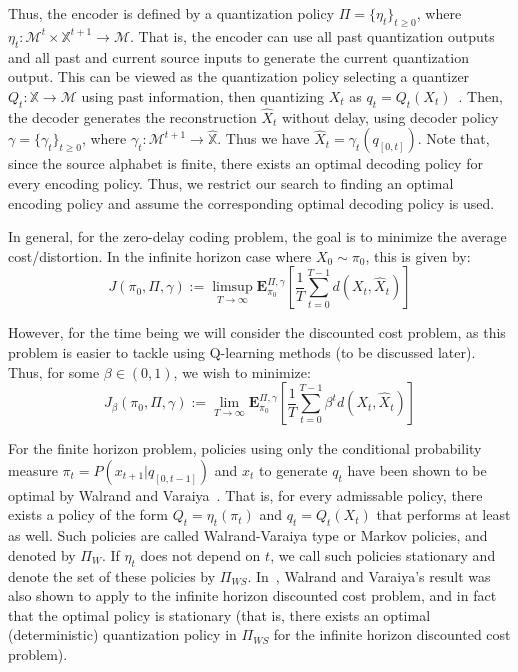 \documentclass{article}
\begin{document}
Thus, the encoder is defined by a quantization policy \( \Pi = \{\eta_t\}_{t \ge 0} \), where \( \eta_t : \mathcal{M}^t \times \mathbb{X}^{t+1} \to \mathcal{M} \). That is, the encoder can use all past quantization outputs and all past and current source inputs to generate the current quantization output. This can be viewed as the quantization policy selecting a quantizer \( Q_t : \mathbb{X} \to \mathcal{M} \) using past information, then quantizing \( X_t \) as \( q_t = Q_t(X_t) \)~\cite{Linder}. Then, the decoder generates the reconstruction \( \hat{X}_t \) without delay, using decoder policy \( \gamma = \{\gamma_t\}_{t \ge 0} \), where \( \gamma_t : \mathcal{M}^{t+1} \to \hat{\mathbb{X}} \). Thus we have \( \hat{X}_t = \gamma_t(q_{[0,t]}) \). Note that, since the source alphabet is finite, there exists an optimal decoding policy for every encoding policy. Thus, we restrict our search to finding an optimal encoding policy and assume the corresponding optimal decoding policy is used.

In general, for the zero-delay coding problem, the goal is to minimize the average cost/distortion. In the infinite horizon case where \( X_0 \sim \pi_0 \), this is given by: %
\[ J(\pi_0, \Pi, \gamma) := \limsup_{T\to\infty}\mathbf{E}_{\pi_0}^{\Pi, \gamma}\left[\frac{1}{T}\sum_{t=0}^{T-1}d(X_t,\hat{X}_t)\right] \]

However, for the time being we will consider the discounted cost problem, as this problem is easier to tackle using Q-learning methods (to be discussed later). Thus, for some \( \beta \in (0,1) \), we wish to minimize:
\[ J_{\beta}(\pi_0, \Pi, \gamma) := \lim_{T\to\infty}\mathbf{E}_{\pi_0}^{\Pi, \gamma}\left[\frac{1}{T}\sum_{t=0}^{T-1}\beta^t d(X_t,\hat{X}_t)\right] \]

For the finite horizon problem, policies using only the conditional probability measure \( \pi_t = P(x_{t+1}|q_{[0,t-1]}) \) and \( x_t \) to generate \( q_t \) have been shown to be optimal by Walrand and Varaiya~\cite{Walrand}. That is, for every admissable policy, there exists a policy of the form \( Q_t = \eta_t(\pi_t) \) and \( q_t = Q_t(X_t) \) that performs at least as well. Such policies are called Walrand-Varaiya type or Markov policies, and denoted by \( \Pi_{W} \). If \( \eta_t \) does not depend on \( t \), we call such policies stationary and denote the set of these policies by \( \Pi_{WS} \). In~\cite{Wood}, Walrand and Varaiya's result was also shown to apply to the infinite horizon discounted cost problem, and in fact that the optimal policy is stationary (that is, there exists an optimal (deterministic) quantization policy in \( \Pi_{WS} \) for the infinite horizon discounted cost problem).
\end{document}
